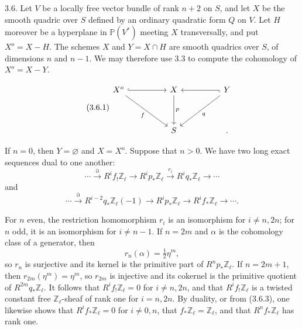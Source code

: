 3.6. Let $V$ be a locally free vector bundle of rank $n+2$ on $S$, and
let $X$ be the smooth quadric over $S$ defined by an ordinary quadratic
form $Q$ on $V$.  Let $H$ moreover be a hyperplane in
$\mathbb P(V^*)$ meeting $X$ transversally, and put $X^o=X-H$.  The
schemes $X$ and $Y=X\cap H$ are smooth quadrics over $S$, of dimensions
$n$ and $n-1$.  We may therefore use 3.3 to compute the cohomology of
$X^o=X-Y$.


\begin{equation}\tag{3.6.1}
\begin{tikzcd}[column sep=huge,row sep=huge]
X^o \arrow[r,hook] \arrow[rd,"f"']
  & X \arrow[d,"p"]
  & Y \arrow[l,hook] \arrow[ld,"q"]\\
{} & S & \mathord{.}
\end{tikzcd}
\end{equation}

If $n=0$, then $Y=\varnothing$ and $X=X^o$.  Suppose that $n>0$.  We
have two long exact sequences dual to one another:
\begin{equation}\tag{3.6.2}
\cdots\xrightarrow{\partial}R^if_!\mathbb Z_\ell
\longrightarrow R^ip_*\mathbb Z_\ell
\xrightarrow{r_i}R^iq_*\mathbb Z_\ell\longrightarrow\cdots
\end{equation}
and
\begin{equation}\tag{3.6.3}
\cdots\xrightarrow{\partial}R^{i-2}q_*\mathbb Z_\ell(-1)
\longrightarrow R^ip_*\mathbb Z_\ell
\longrightarrow R^if_*\mathbb Z_\ell\longrightarrow\cdots.
\end{equation}

For $n$ even, the restriction homomorphism $r_i$ is an isomorphism for
$i\neq n,2n$; for $n$ odd, it is an isomorphism for $i\neq n-1$.  If
$n=2m$ and $\alpha$ is the cohomology class of a generator, then
\begin{equation*}
r_n(\alpha)=\tfrac12\eta^m,
\end{equation*}
so $r_n$ is surjective and its kernel is the primitive part of
$R^np_*\mathbb Z_\ell$.  If $n=2m+1$, then
$r_{2m}(\eta^m)=\eta^m$, so $r_{2m}$ is injective and its cokernel is the
primitive quotient of $R^{2m}q_*\mathbb Z_\ell$.  It follows that
$R^if_!\mathbb Z_\ell=0$ for $i\neq n,2n$, and that
$R^if_!\mathbb Z_\ell$ is a twisted constant free
$\mathbb Z_\ell$-sheaf of rank one for $i=n,2n$.  By duality, or from
(3.6.3), one likewise shows that $R^if_*\mathbb Z_\ell=0$ for
$i\neq0,n$, that $f_*\mathbb Z_\ell=\mathbb Z_\ell$, and that
$R^nf_*\mathbb Z_\ell$ has rank one.

